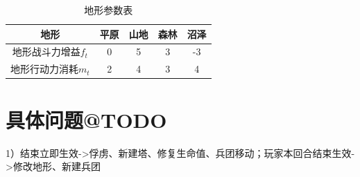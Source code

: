 \documentclass[a4paper,4pt]{article}
\begin{document}
\begin{table}[htbp]
	\centering
	\caption{地形参数表}
	\begin{tabular}{c|c|c|c|c}
		\hline
		地形                & 平原 & 山地 & 森林 & 沼泽 \bigstrut \\
		\hline
		地形战斗力增益$f_t$ & 0    & 5    & 3    & -3 \bigstrut   \\
		\hline
		地形行动力消耗$m_t$ & 2    & 4    & 3    & 4 \bigstrut    \\
		\hline
	\end{tabular}%
	\label{地形}%
\end{table}%
\section{具体问题@TODO}
1）结束立即生效->俘虏、新建塔、修复生命值、兵团移动；玩家本回合结束生效->修改地形、新建兵团\par
\end{document}
